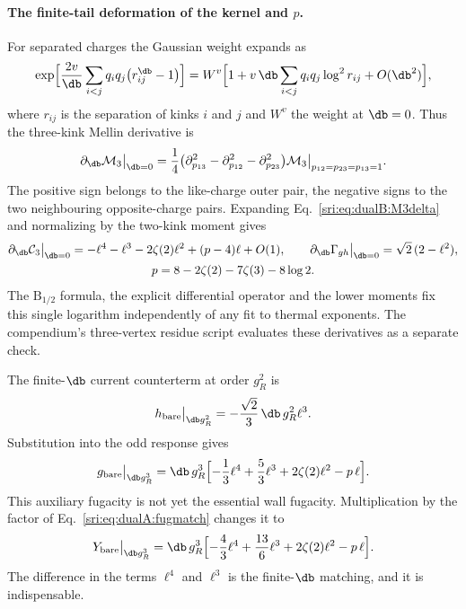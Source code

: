 \paragraph{The finite-tail deformation of the kernel and $p$.} For separated charges the Gaussian weight expands as
\begin{equation}
 \exp\Bigl[\frac{2v}{\db}\sum_{i<j}q_iq_j\bigl(r_{ij}^{\db}-1\bigr)\Bigr]
 =W^v\Bigl[1+v\,\db\sum_{i<j}q_iq_j\log^2r_{ij}+O(\db^2)\Bigr],
\end{equation}
where $r_{ij}$ is the separation of kinks $i$ and $j$ and $W^v$ the weight at $\db=0$. Thus the three-kink Mellin
derivative is
\begin{equation}
 \partial_{\db}\mathcal M_3\big|_{\db=0}=\frac14\bigl(\partial_{p_{13}}^2-\partial_{p_{12}}^2-\partial_{p_{23}}^2\bigr)
 \mathcal M_3\big|_{p_{12}=p_{23}=p_{13}=1}.
 \label{sri:eq:dualB:M3delta}
\end{equation}
The positive sign belongs to the like-charge outer pair, the negative signs to the two neighbouring opposite-charge
pairs. Expanding Eq.~\eqref{sri:eq:dualB:M3delta} and normalizing by the two-kink moment gives
\begin{equation}
\begin{gathered}
 \partial_{\db}\mathcal C_3\big|_{\db=0}=-\ell^4-\ell^3-2\zeta(2)\ell^2+(p-4)\ell+O(1),\qquad
 \partial_{\db}\Gamma_{gh}\big|_{\db=0}=\sqrt2\,(2-\ell^2),\\
 p=8-2\zeta(2)-7\zeta(3)-8\log2.
\end{gathered}
\label{sri:eq:dualB:panswer}
\end{equation}
The $\mathrm B_{1/2}$ formula, the explicit differential operator and the lower moments fix this single logarithm
independently of any fit to thermal exponents. The compendium's three-vertex residue script evaluates these
derivatives as a separate check.

The finite-$\db$ current counterterm at order $g_R^2$ is
\begin{equation}
 h_{\rm bare}\big|_{\db g_R^2}=-\frac{\sqrt2}{3}\,\db\,g_R^2\ell^3.
\end{equation}
Substitution into the odd response gives
\begin{equation}
 g_{\rm bare}\big|_{\db g_R^3}=\db\,g_R^3\Bigl[-\frac13\ell^4+\frac53\ell^3+2\zeta(2)\ell^2-p\,\ell\Bigr].
 \label{sri:eq:dualB:auxDeltaCt}
\end{equation}
This auxiliary fugacity is not yet the essential wall fugacity. Multiplication by the factor of
Eq.~\eqref{sri:eq:dualA:fugmatch} changes it to
\begin{equation}
 Y_{\rm bare}\big|_{\db g_R^3}=\db\,g_R^3\Bigl[-\frac43\ell^4+\frac{13}{6}\ell^3+2\zeta(2)\ell^2-p\,\ell\Bigr].
 \label{sri:eq:dualB:physicalDeltaCt}
\end{equation}
The difference in the terms $\ell^4$ and $\ell^3$ is the finite-$\db$ matching, and it is indispensable.

